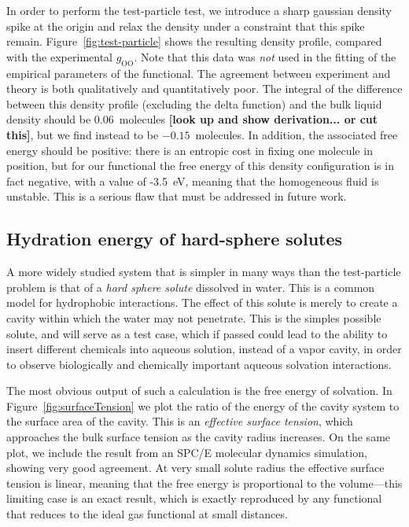\documentclass[letterpaper,twocolumn,amsmath,amssymb,prb]{revtex4}
\newcommand{\red}[1]{{\bf \color{red} #1}}
\newcommand{\fixme}[1]{\red{[#1]}}
\begin{document}
In order to perform the test-particle test, we introduce a sharp
gaussian density spike at the origin and relax the density under a
constraint that this spike remain.  Figure~\ref{fig:test-particle}
shows the resulting density profile, compared with the experimental
$g_{\textrm{OO}}$.  Note that this data was \emph{not} used in the
fitting of the empirical parameters of the functional.  The agreement
between experiment and theory is both qualitatively and quantitatively
poor.  The integral of the difference between this density profile
(excluding the delta function) and the bulk liquid density should be
0.06~molecules \fixme{look up and show derivation... or cut this},
but we find instead to be $-0.15$~molecules.  In addition, the associated
free energy should be positive: there is an entropic cost in fixing
one molecule in position, but for our functional the free energy of
this density configuration is in fact negative, with a value of
-3.5~eV, meaning that the homogeneous fluid is unstable.  This is a
serious flaw that must be addressed in future work.

\subsection{Hydration energy of hard-sphere solutes}

A more widely studied system that is simpler in many ways than the
test-particle problem is that of a \emph{hard sphere solute} dissolved
in water.  This is a common model for hydrophobic interactions.  The
effect of this solute is merely to create a cavity within which the
water may not penetrate.  This is the simples possible solute, and
will serve as a test case, which if passed could lead to the ability
to insert different chemicals into aqueous solution, instead of a
vapor cavity, in order to observe biologically and chemically
important aqueous solvation interactions.

The most obvious output of such a calculation is the free energy of
solvation.  In Figure~\ref{fig:surfaceTension} we plot the ratio of the
energy of the cavity system to the surface area of the cavity.  This
is an \emph{effective surface tension}, which approaches the bulk
surface tension as the cavity radius increases.  On the same plot, we
include the result from an SPC/E molecular dynamics
simulation\cite{huang2001shs}, showing very good agreement.  At very
small solute radius the effective surface tension is linear, meaning
that the free energy is proportional to the volume---this limiting
case is an exact result, which is exactly reproduced by any functional
that reduces to the ideal gas functional at small distances.
\end{document}
